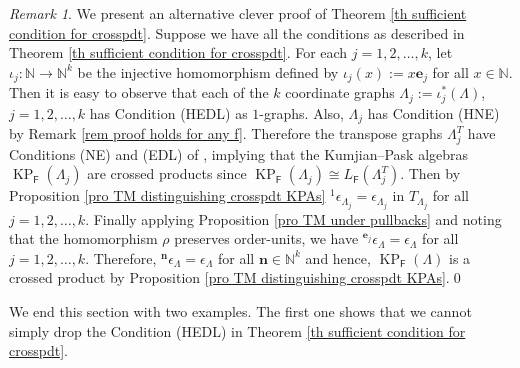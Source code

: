 \documentclass[a4paper,reqno,12pt]{amsart}
\numberwithin{equation}{section}
\theoremstyle{definition}
\theoremstyle{remark}
\newtheorem{rmk}[thm]{Remark}
\newcommand{\KP}{\operatorname{KP}}
\newcommand{\N}{\mathbf{n}}
\begin{document}
\begin{rmk}\label{rem an alternative proof}
We present an alternative clever proof of Theorem \ref{th sufficient condition for crosspdt}. Suppose we have all the conditions as described in Theorem \ref{th sufficient condition for crosspdt}. For each $j=1,2,\ldots,k$, let $\iota_j:\mathbb{N}\longrightarrow \mathbb{N}^k$ be the injective homomorphism defined by $\iota_j(x):=x\mathbf{e}_j$ for all $x\in \mathbb{N}$. Then it is easy to observe that each of the $k$ coordinate graphs $\Lambda_j:=\iota_j^*(\Lambda)$, $j=1,2,\ldots,k$ has Condition (HEDL) as $1$-graphs. Also, $\Lambda_j$ has Condition (HNE) by Remark \ref{rem proof holds for any f}. Therefore the transpose graphs $\Lambda_j^{T}$ have Conditions (NE) and (EDL) of \cite{Vas}, implying that the Kumjian--Pask algebras $\KP_\mathsf{F}(\Lambda_j)$ are crossed products since $\KP_\mathsf{F}(\Lambda_j)\cong L_\mathsf{F}(\Lambda_j^{T})$. Then by Proposition \ref{pro TM distinguishing crosspdt KPAs} $^1\epsilon_{\Lambda_j}=\epsilon_{\Lambda_j}$ in $T_{\Lambda_j}$ for all $j=1,2,\ldots,k$. Finally applying Proposition \ref{pro TM under pullbacks} and noting that the homomorphism $\rho$ preserves order-units, we have $^{\mathbf{e}_j}\epsilon_\Lambda=\epsilon_\Lambda$ for all $j=1,2,\ldots,k$. Therefore, $^\N \epsilon_\Lambda=\epsilon_\Lambda$ for all $\N\in \mathbb{N}^k$ and hence, $\KP_\mathsf{F}(\Lambda)$ is a crossed product by Proposition \ref{pro TM distinguishing crosspdt KPAs}.\qed
\end{rmk}

We end this section with two examples. The first one shows that we cannot simply drop the Condition (HEDL) in Theorem \ref{th sufficient condition for crosspdt}. 
\end{document}
